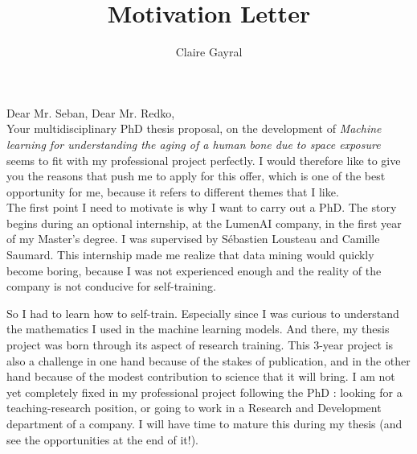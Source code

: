 \documentclass[a4paper,12pt, english]{article}
\title{Motivation Letter}
\author{Claire Gayral}
\date{}
\begin{document}
\maketitle



Dear Mr. Seban, Dear Mr. Redko,\\

Your multidisciplinary PhD thesis proposal, on the development of \textit{Machine learning for understanding the aging of a human bone due to space exposure} seems to fit with my professional project perfectly. I would therefore like to give you the reasons that push me to apply for this offer, which is one of the best opportunity for me, because it refers to different themes that I like. \\

The first point I need to motivate is why I want to carry out a PhD. The story begins during an optional internship, at the LumenAI company, in the first year of my Master's degree. I was supervised by Sébastien Lousteau and Camille Saumard. This internship made me realize that data mining would quickly become boring, because I was not experienced enough and the reality of the company  is not conducive for self-training. 

So I had to learn how to self-train. Especially since I was curious to understand the mathematics I used in the machine learning models.
And there, my thesis project was born through its aspect of research training. 
This 3-year project is also a challenge in one hand because of the stakes of publication, and in the other hand because of the modest contribution to science that it will bring. I am not yet completely fixed in my professional project following the PhD : looking for a teaching-research position, or going to work in a Research and Development department of a company. I will have time to mature this during my thesis (and see the opportunities at the end of it!). 
\end{document}

